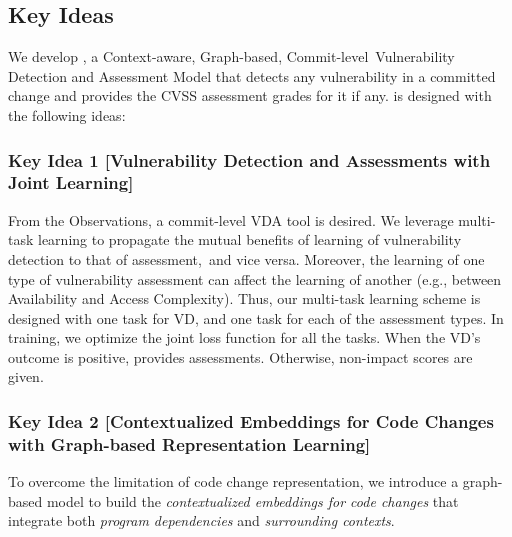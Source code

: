 \subsection{Key Ideas}
\label{key-ideas:sec}

We develop {\tool}, a Context-aware, Graph-based,
Commit-level~Vulnerability Detection and Assessment Model that detects
any vulnerability in a committed change and provides the CVSS
assessment grades for it if any.  {\tool} is designed with the
following ideas:


\subsubsection{Key Idea 1 [Vulnerability Detection and
    Assessments with Joint Learning]}

From the Observations, a commit-level VDA tool is desired. We leverage
multi-task learning to propagate the mutual benefits of learning of
vulnerability detection to that of assessment,~and vice
versa. Moreover, the learning of one type of vulnerability assessment
can affect the learning of another (e.g., between Availability and
Access Complexity). Thus, our multi-task learning scheme is designed
with one task for VD, and one task for each of the assessment
types. In training, we optimize the joint loss function for all the
tasks. When the VD's outcome is positive, {\tool} provides
assessments. Otherwise, non-impact scores are given.



\subsubsection{Key Idea 2 [Contextualized Embeddings for
    Code Changes with Graph-based Representation Learning]}
To overcome the limitation of code change representation, we introduce
a graph-based model to build the {\em contextualized embeddings for
  code changes} that integrate both {\em program dependencies} and
{\em surrounding contexts}.

